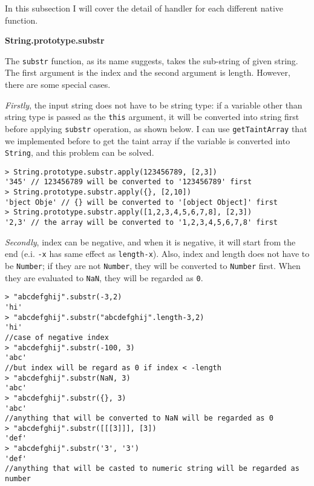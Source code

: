 {In this subsection I will cover the detail of handler for each different native function.

\textbf{String.prototype.substr}

The \texttt{substr} function, as its name suggests, takes the sub-string of given string. The first argument is the index and the second argument is length. However, there are some special cases. 

\textit{Firstly}, the input string does not have to be string type: if a variable other than string type is passed as the \texttt{this} argument, it will be converted into string first before applying \texttt{substr} operation, as shown below. I can use \texttt{getTaintArray} that we implemented before to get the taint array if the variable is converted into \texttt{String}, and this problem can be solved.

\begin{verbatim}
> String.prototype.substr.apply(123456789, [2,3])
'345' // 123456789 will be converted to '123456789' first
> String.prototype.substr.apply({}, [2,10])
'bject Obje' // {} will be converted to '[object Object]' first
> String.prototype.substr.apply([1,2,3,4,5,6,7,8], [2,3])
'2,3' // the array will be converted to '1,2,3,4,5,6,7,8' first
\end{verbatim}

\textit{Secondly}, index can be negative, and when it is negative, it will start from the end (e.i. \texttt{-x} has same effect as \texttt{length-x}). Also, index and length does not have to be \texttt{Number}; if they are not \texttt{Number}, they will be converted to \texttt{Number} first. When they are evaluated to \texttt{NaN}, they will be regarded as \texttt{0}.

\begin{verbatim}
> "abcdefghij".substr(-3,2)
'hi'
> "abcdefghij".substr("abcdefghij".length-3,2)
'hi'
//case of negative index
> "abcdefghij".substr(-100, 3)
'abc'
//but index will be regard as 0 if index < -length
> "abcdefghij".substr(NaN, 3)
'abc'
> "abcdefghij".substr({}, 3)
'abc'
//anything that will be converted to NaN will be regarded as 0
> "abcdefghij".substr([[[3]]], [3])
'def'
> "abcdefghij".substr('3', '3')
'def'
//anything that will be casted to numeric string will be regarded as number
\end{verbatim}

}
